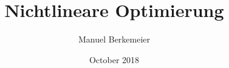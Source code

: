 \documentclass[11pt]{report}
\title{Nichtlineare Optimierung}
\author{Manuel Berkemeier}
\date{October 2018}
\begin{document}
\nocite{*}
\maketitle





\end{document}
